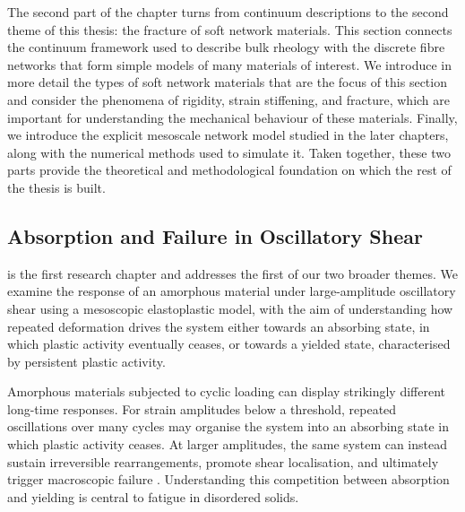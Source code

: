 \documentclass[asymmetricmargins]{library/duthesis}%
\begin{document}
The second part of the chapter turns from continuum descriptions to the second theme of this thesis: the fracture of soft network materials. This section connects the continuum framework used to describe bulk rheology with the discrete fibre networks that form simple models of many materials of interest. We introduce in more detail the types of soft network materials that are the focus of this section and consider the phenomena of rigidity, strain stiffening, and fracture, which are important for understanding the mechanical behaviour of these materials. Finally, we introduce the explicit mesoscale network model studied in the later chapters, along with the numerical methods used to simulate it. Taken together, these two parts provide the theoretical and methodological foundation on which the rest of the thesis is built.

\subsection*{Absorption and Failure in Oscillatory Shear}
 is the first research chapter and addresses the first of our two broader themes. We examine the response of an amorphous material under large-amplitude oscillatory shear using a mesoscopic elastoplastic model, with the aim of understanding how repeated deformation drives the system either towards an absorbing state, in which plastic activity eventually ceases, or towards a yielded state, characterised by persistent plastic activity.

Amorphous materials subjected to cyclic loading can display strikingly different long-time responses. For strain amplitudes below a threshold, repeated oscillations over many cycles may organise the system into an absorbing state in which plastic activity ceases. At larger amplitudes, the same system can instead sustain irreversible rearrangements, promote shear localisation, and ultimately trigger macroscopic failure \cite{pineChaosThresholdIrreversibility2005,Cort2008,Fiocco2013,Regev_onset_2013,kawasakiMacroscopicYieldingJammed2016,Leishangthem2017,JocteurYielding2024}. Understanding this competition between absorption and yielding is central to fatigue in disordered solids.
\end{document}
